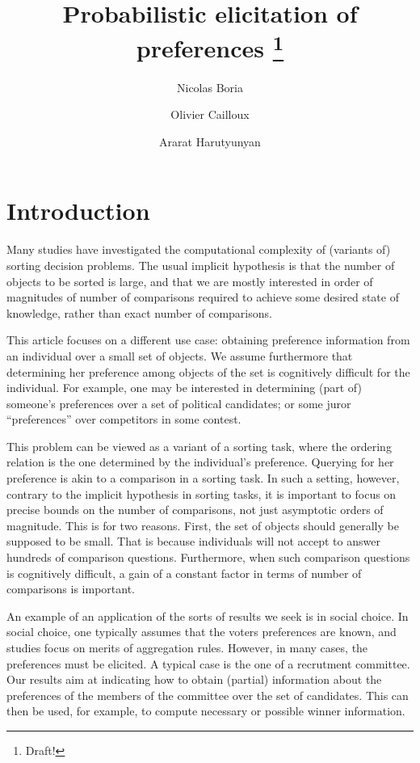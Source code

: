 \documentclass[version=3.21, pagesize, twoside=off, bibliography=totoc, DIV=calc, fontsize=12pt, a4paper]{scrartcl}
\title{Probabilistic elicitation of preferences \thanks{Draft!}}
\author{Nicolas Boria}
\author{Olivier Cailloux}
\author{Ararat Harutyunyan}
\affil{Université Paris-Dauphine, PSL Research University, CNRS, LAMSADE, 75016 PARIS, FRANCE\\
	\href{mailto:olivier.cailloux@dauphine.fr}{olivier.cailloux@dauphine.fr}
}
\begin{document}
\maketitle

\section{Introduction}
Many studies have investigated the computational complexity of (variants of) sorting decision problems. The usual implicit hypothesis is that the number of objects to be sorted is large, and that we are mostly interested in order of magnitudes of number of comparisons required to achieve some desired state of knowledge, rather than exact number of comparisons.

This article focuses on a different use case: obtaining preference information from an individual over a small set of objects. We assume furthermore that determining her preference among objects of the set is cognitively difficult for the individual. For example, one may be interested in determining (part of) someone’s preferences over a set of political candidates; or some juror “preferences” over competitors in some contest.

This problem can be viewed as a variant of a sorting task, where the ordering relation is the one determined by the individual’s preference. Querying for her preference is akin to a comparison in a sorting task. In such a setting, however, contrary to the implicit hypothesis in sorting tasks, it is important to focus on precise bounds on the number of comparisons, not just asymptotic orders of magnitude. This is for two reasons. First, the set of objects should generally be supposed to be small. That is because individuals will not accept to answer hundreds of comparison questions. Furthermore, when such comparison questions is cognitively difficult, a gain of a constant factor in terms of number of comparisons is important.

An example of an application of the sorts of results we seek is in social choice. In social choice, one typically assumes that the voters preferences are known, and studies focus on merits of aggregation rules. However, in many cases, the preferences must be elicited. A typical case is the one of a recrutment committee. Our results aim at indicating how to obtain (partial) information about the preferences of the members of the committee over the set of candidates. This can then be used, for example, to compute necessary or possible winner information.
\end{document}
